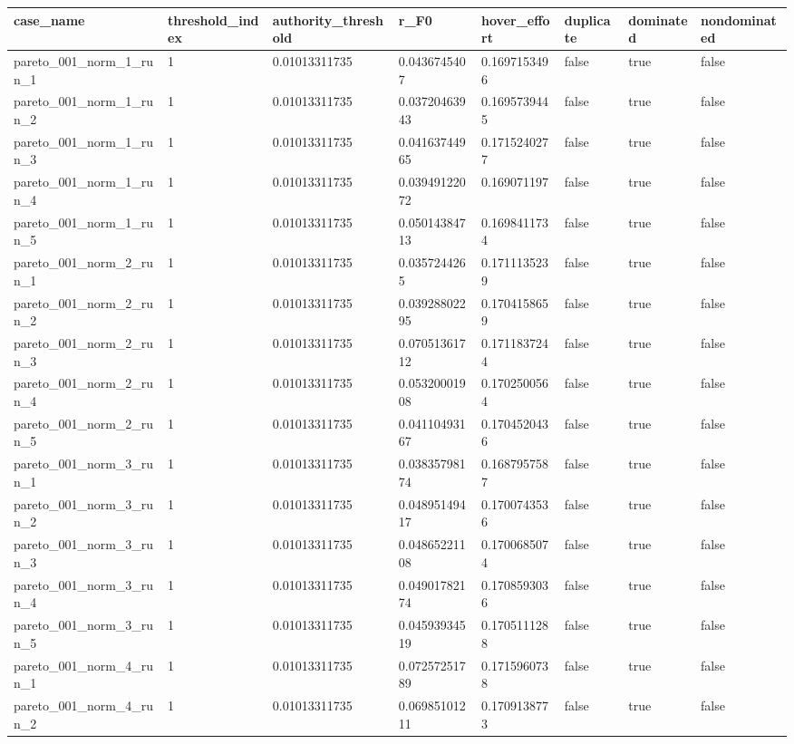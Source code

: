 \begin{tabular}{@{}llllllll@{}}
\toprule
case\_name & threshold\_index & authority\_threshold & r\_F0 & hover\_effort & duplicate & dominated & nondominated \\
\midrule
pareto\_001\_norm\_1\_run\_1 & 1 & 0.01013311735 & 0.0436745407 & 0.1697153496 & false & true & false \\
pareto\_001\_norm\_1\_run\_2 & 1 & 0.01013311735 & 0.03720463943 & 0.1695739445 & false & true & false \\
pareto\_001\_norm\_1\_run\_3 & 1 & 0.01013311735 & 0.04163744965 & 0.1715240277 & false & true & false \\
pareto\_001\_norm\_1\_run\_4 & 1 & 0.01013311735 & 0.03949122072 & 0.169071197 & false & true & false \\
pareto\_001\_norm\_1\_run\_5 & 1 & 0.01013311735 & 0.05014384713 & 0.1698411734 & false & true & false \\
pareto\_001\_norm\_2\_run\_1 & 1 & 0.01013311735 & 0.0357244265 & 0.1711135239 & false & true & false \\
pareto\_001\_norm\_2\_run\_2 & 1 & 0.01013311735 & 0.03928802295 & 0.1704158659 & false & true & false \\
pareto\_001\_norm\_2\_run\_3 & 1 & 0.01013311735 & 0.07051361712 & 0.1711837244 & false & true & false \\
pareto\_001\_norm\_2\_run\_4 & 1 & 0.01013311735 & 0.05320001908 & 0.1702500564 & false & true & false \\
pareto\_001\_norm\_2\_run\_5 & 1 & 0.01013311735 & 0.04110493167 & 0.1704520436 & false & true & false \\
pareto\_001\_norm\_3\_run\_1 & 1 & 0.01013311735 & 0.03835798174 & 0.1687957587 & false & true & false \\
pareto\_001\_norm\_3\_run\_2 & 1 & 0.01013311735 & 0.04895149417 & 0.1700743536 & false & true & false \\
pareto\_001\_norm\_3\_run\_3 & 1 & 0.01013311735 & 0.04865221108 & 0.1700685074 & false & true & false \\
pareto\_001\_norm\_3\_run\_4 & 1 & 0.01013311735 & 0.04901782174 & 0.1708593036 & false & true & false \\
pareto\_001\_norm\_3\_run\_5 & 1 & 0.01013311735 & 0.04593934519 & 0.1705111288 & false & true & false \\
pareto\_001\_norm\_4\_run\_1 & 1 & 0.01013311735 & 0.07257251789 & 0.1715960738 & false & true & false \\
pareto\_001\_norm\_4\_run\_2 & 1 & 0.01013311735 & 0.06985101211 & 0.1709138773 & false & true & false \\

\end{tabular}
